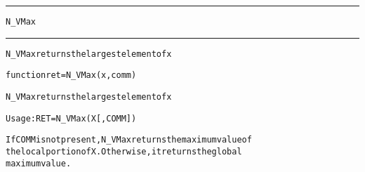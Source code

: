 \begin{samepage}
\hrule
\begin{center}
{\large \verb!N_VMax!}
\label{p:N_VMax}
\end{center}
\hrule\vspace{0.1in}



\begin{alltt}
N_VMax returns the largest element of x
\end{alltt}

\end{samepage}



\begin{samepage}


\begin{alltt}
function ret = N_VMax(x,comm) 
\end{alltt}

\end{samepage}



\begin{alltt}
N_VMax returns the largest element of x

   Usage:  RET = N_VMax ( X [, COMM] )

If COMM is not present, N_VMax returns the maximum value of 
the local portion of X. Otherwise, it returns the global
maximum value.
\end{alltt}





 



\vspace{0.1in}